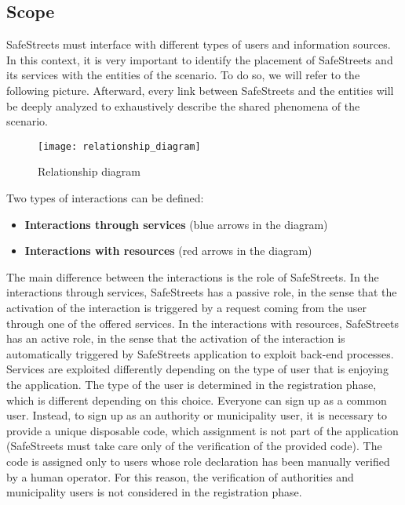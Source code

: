 \documentclass[./main.tex]{subfiles}
\begin{document}
\subsection{Scope}

SafeStreets must interface with different types of users and information
sources. In this context, it is very important to identify the placement
of SafeStreets and its services with the entities of the scenario. To do
so, we will refer to the following picture. Afterward, every link
between SafeStreets and the entities will be deeply analyzed to
exhaustively describe the shared phenomena of the scenario.

\begin{figure}[H]
\centering
\texttt{[image: relationship\_diagram]}
\caption{Relationship diagram}
\end{figure}

Two types of interactions can be defined:
\begin{itemize}
\item
  \textbf{Interactions through services} (blue arrows in the diagram)
\item
  \textbf{Interactions with resources} (red arrows in the diagram)
\end{itemize}

The main difference between the interactions is the role of SafeStreets.
In the interactions through services, SafeStreets has a
passive role, in the sense that the activation of the interaction is
triggered by a request coming from the user through one of the offered
services. In the interactions with resources, SafeStreets has an active
role, in the sense that the activation of the interaction is
automatically triggered by SafeStreets application to exploit back-end
processes.
\medskip\\
Services are exploited differently depending on the type of user that is
enjoying the application. The type of the user is determined in the
registration phase, which is different depending on this choice.
Everyone can sign up as a common user. Instead, to sign up as an
authority or municipality user, it is necessary to provide a unique
disposable code, which assignment is not part of the application
(SafeStreets must take care only of the verification of the provided
code). The code is assigned only to users whose role declaration has
been manually verified by a human operator. For this reason, the
verification of authorities and municipality users is not considered in
the registration phase.
\end{document}
